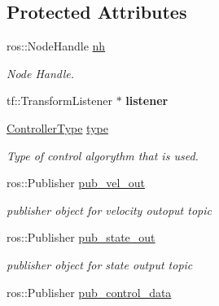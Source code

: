\subsection*{Protected Attributes}
\begin{DoxyCompactItemize}
\item 
ros\+::\+Node\+Handle \hyperlink{classController_a24e3d3c2536f6ed29018bad1fd53dae2}{nh}\hypertarget{classController_a24e3d3c2536f6ed29018bad1fd53dae2}{}\label{classController_a24e3d3c2536f6ed29018bad1fd53dae2}

\begin{DoxyCompactList}\small\item\em Node Handle. \end{DoxyCompactList}\item 
tf\+::\+Transform\+Listener $\ast$ {\bfseries listener}\hypertarget{classController_afea373f808d583e4ad613f119439a8f5}{}\label{classController_afea373f808d583e4ad613f119439a8f5}

\item 
\hyperlink{classController_aa6d956c4c220461a4152415ffa78690a}{Controller\+Type} \hyperlink{classController_a17792cff397dc69baca568c7d03f2fc8}{type}\hypertarget{classController_a17792cff397dc69baca568c7d03f2fc8}{}\label{classController_a17792cff397dc69baca568c7d03f2fc8}

\begin{DoxyCompactList}\small\item\em Type of control algorythm that is used. \end{DoxyCompactList}\item 
ros\+::\+Publisher \hyperlink{classController_a8428549596cff57f48390ac25706545a}{pub\+\_\+vel\+\_\+out}\hypertarget{classController_a8428549596cff57f48390ac25706545a}{}\label{classController_a8428549596cff57f48390ac25706545a}

\begin{DoxyCompactList}\small\item\em publisher object for velocity outoput topic \end{DoxyCompactList}\item 
ros\+::\+Publisher \hyperlink{classController_a6abeaf23d1c17d6af6eecf7d1479fe31}{pub\+\_\+state\+\_\+out}\hypertarget{classController_a6abeaf23d1c17d6af6eecf7d1479fe31}{}\label{classController_a6abeaf23d1c17d6af6eecf7d1479fe31}

\begin{DoxyCompactList}\small\item\em publisher object for state output topic \end{DoxyCompactList}\item 
ros\+::\+Publisher \hyperlink{classController_afde3eefcf7ac040b2a38a8d1e95a6077}{pub\+\_\+control\+\_\+data}\hypertarget{classController_afde3eefcf7ac040b2a38a8d1e95a6077}{}\label{classController_afde3eefcf7ac040b2a38a8d1e95a6077}


\end{DoxyCompactItemize}
